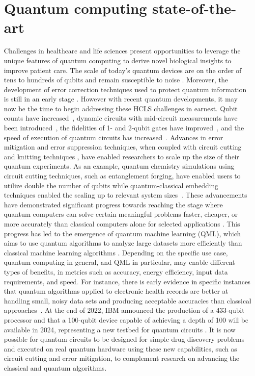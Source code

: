 \documentclass{article}
\begin{document}
\section{Quantum computing state-of-the-art}
Challenges in healthcare and life sciences present opportunities to leverage the unique features of quantum computing to derive novel biological insights to improve patient care.
The scale of today's quantum devices are on the order of tens to hundreds of qubits and remain susceptible to noise \cite{chow_dial_gambetta_2022}. Moreover, the development of error correction techniques used to protect quantum information is still in an early stage \cite{lin2023empirical, google2023suppressing, egan2021fault}. However with recent quantum developments, it may now be the time to begin addressing these HCLS challenges in earnest. 
Qubit counts have increased~\cite{chow_dial_gambetta_2022}, dynamic circuits with mid-circuit measurements have been introduced~\cite{cross2022openqasm}, the fidelities of 1- and 2-qubit gates have improved~\cite{jurcevic2021demonstration}, and the speed of execution of quantum circuits has increased~\cite{wack2021quality}. Advances in error mitigation and error suppression techniques, when coupled with circuit cutting and knitting techniques \cite{piveteau2022circuit, shehab2019noise, patti2022markov}, have enabled researchers to scale up the size of their quantum experiments. 
As an example, quantum chemistry simulations using circuit cutting techniques, such as entanglement forging, have enabled users to utilize double the number of qubits \cite{smith2023clifford} while quantum-classical embedding techniques enabled the scaling up to relevant system sizes~\cite{Rossmannek2021, Rossmannek2023}.
These advancements have demonstrated significant progress towards reaching the stage where quantum computers can solve certain meaningful problems faster, cheaper, or more accurately than classical computers alone for selected applications \cite{kim2023scalable, van2022probabilistic, bravyi2022future}. 
This progress has led to the emergence of quantum machine learning (QML), which aims to use quantum algorithms to analyze large datasets more efficiently than classical machine learning algorithms \cite{cerezo2022challenges}. Depending on the specific use case, quantum computing in general, and QML in particular, may enable different types of benefits, in metrics such as accuracy, energy efficiency, input data requirements, and speed. For instance, there is early evidence in specific instances that quantum algorithms applied to electronic health records are better at handling small, noisy data sets and producing acceptable accuracies than classical approaches~\cite{krunic2022quantum}.
At the end of 2022, IBM announced the production of a 433-qubit processor and that a 100-qubit device capable of achieving a depth of 100 will be available in 2024, representing a new testbed for quantum circuits \cite{IBMQuantumCentricSupercomputing}. It is now possible for quantum circuits to be designed for simple drug discovery problems \cite{cao2018potential,Mensa_2023,Barkoutsos2021, kiss2022quantum} and executed on real quantum hardware using these new capabilities, such as circuit cutting and error mitigation, to complement research on advancing the classical and quantum algorithms.
\end{document}
